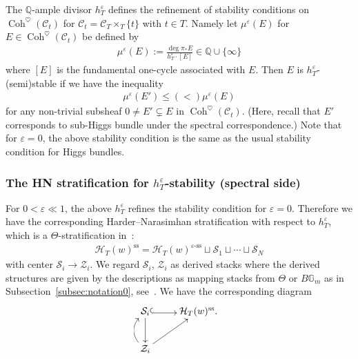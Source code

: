 \documentclass[11pt,oneside,a4paper,mathscr]{amsart}
\makeatletter
\theoremstyle{definition}
\renewcommand{\leq}{\leqslant}
\newcommand{\cS}{\mathcal{S}}
\newcommand{\cH}{\mathcal{H}}
\newcommand{\cC}{\mathcal{C}}
\newcommand{\bgm}{B\mathbb{G}_m}
\newcommand{\Coh}{\operatorname{Coh}}
\newcommand{\inclusion}{\ar@<-0.3ex>@{^{(}->}[r]}
\makeatother
\begin{document}
The $\mathbb{Q}$-ample divisor $h_T^{\varepsilon}$ defines the refinement of 
stability conditions on $\Coh^{\heartsuit}(\cC_t)$ for $\cC_t=\cC_{T}\times_T \{t\}$ with $t\in T$. 
Namely let $\mu^{\varepsilon}(E)$ for $E\in \Coh^{\heartsuit}(\cC_t)$ be defined by 
\begin{align}\label{slope:mue} 
    \mu^{\varepsilon}(E):=\frac{\deg \pi_{*}E}{h_T^{\varepsilon}\cdot [E]} \in \mathbb{Q} \cup \{\infty\}
\end{align}
where $[E]$ is the fundamental one-cycle associated with $E$. 
Then $E$ is $h_T^{\varepsilon}$-(semi)stable 
if we have the inequality 
\begin{align}\label{ineq:muep}
 \mu^{\varepsilon}(E') \leq (<)  \mu^{\varepsilon}(E)
\end{align}
for any non-trivial subsheaf $0\neq E' \subsetneq E$ in $\Coh^{\heartsuit}(\cC_t)$. (Here, recall that $E'$ corresponds to sub-Higgs bundle under the spectral 
correspondence.)
Note that for $\varepsilon=0$, the above stability condition is the same
as the usual stability condition for Higgs bundles. 

\subsubsection*{The HN stratification for $h_T^{\varepsilon}$-stability (spectral side)}
For $0<\varepsilon \ll 1$, the above $h_T^{\varepsilon}$ refines the 
stability condition for $\varepsilon=0$. Therefore we have the corresponding
Harder--Narasimhan stratification with respect to $h_T^{\varepsilon}$, which is 
a 
$\Theta$-stratification in~\cite{Halpinstab}:
\begin{align}\label{Theta:eps}
    \cH_T(w)^{\mathrm{ss}}=\cH_T(w)^{\varepsilon \text{-ss}}\sqcup \mathcal{S}_1 \sqcup \cdots \sqcup \mathcal{S}_N 
\end{align}
with center $\cS_i \to \mathcal{Z}_i$. We regard $\cS_i$, $\mathcal{Z}_i$ as derived stacks where the derived structures are given by the descriptions as mapping stacks from $\Theta$ or $\bgm$ as in Subsection~\ref{subsec:notation0}, see~\cite{Halpinstab, HalpK32}.
We have the corresponding diagram 
\begin{align}\label{dia:S}
\xymatrix{
\cS_i \inclusion \ar[d] 
& \cH_T(w)^{\mathrm{ss}}. \\
\mathcal{Z}_i \ar[ru] \ar@/^12pt/[u]
}
\end{align}
\end{document}
